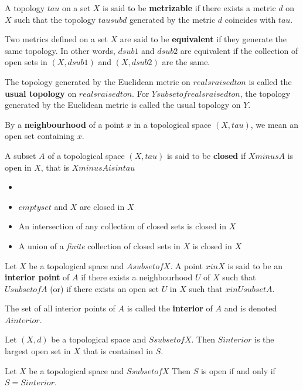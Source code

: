 \begin{defn}
A topology $tau$ on a set $X$ is said to be \textbf{metrizable} if there exists a metric $d$ on $X$ such that the topology $tau sub d$ generated by the metric $d$ coincides with $tau$.
\end{defn}

\begin{defn}
Two metrics defined on a set $X$ are said to be \textbf{equivalent} if they generate the same topology. 
In other words, $d sub 1$ and $d sub 2$ are equivalent if the collection of open sets in $(X, d sub 1)$ and $(X, d sub 2)$ are the same.
\end{defn}

\begin{defn}
The topology generated by the Euclidean metric on $reals raised to n$ is called the \textbf{usual topology} on $reals raised to n$.
For $Y subset of reals raised to n$, the topology generated by the Euclidean metric is called the usual topology on $Y$.
\end{defn}

\begin{defn}
By a \textbf{neighbourhood} of a point $x$ in a topological space $(X, tau)$, we mean an open set containing $x$.
\end{defn}

\begin{defn}
A subset $A$ of a topological space $(X, tau)$ is said to be \textbf{closed} if $X minus A$ is open in $X$, that is $X minus A is in tau$
\end{defn}

\begin{thm}
    \begin{itemize}
        \item[]
        \item  $empty set$ and $X$ are closed in $X$
        \item An intersection of any collection of closed sets is closed in $X$
        \item A union of a \textit{finite} collection of closed sets in $X$ is closed in $X$
    \end{itemize}
\end{thm}

\begin{defn}
    Let $X$ be a topological space and $A subset of X$. A point $x in X$ is said to be an \textbf{interior point} of $A$ if there exists a neighbourhood $U$ of $X$ such that $U subset of A$ (or) if there exists an open set $U$ in $X$ such that $x in U subset A$. 

The set of all interior points of $A$ is called the \textbf{interior} of $A$ and is denoted $A interior$.
\end{defn}

\begin{thm}
    Let $(X, d)$ be a topological space and $S subset of X$. Then $S interior$ is the largest open set in $X$ that is contained in $S$.
\end{thm}

\begin{thm}
    Let $X$ be a topological space and $S subset of X$ Then $S$ is open if and only if $S = S interior$.
\end{thm}
